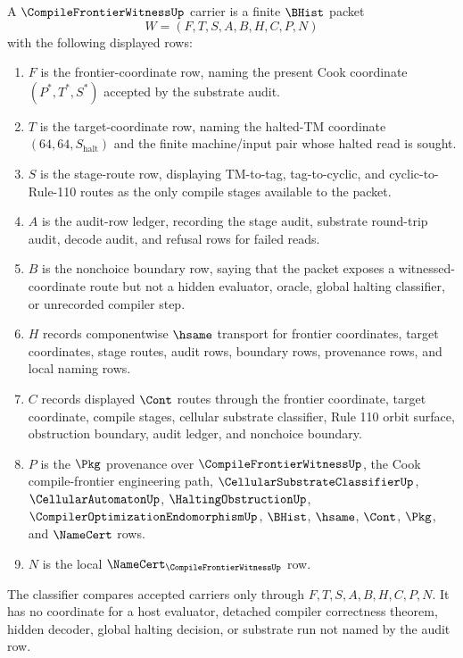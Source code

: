 \begin{definition}
\label{def:compile-frontier-witness-carrier}
A $\CompileFrontierWitnessUp$ carrier is a finite $\BHist$ packet
$$
W=(F,T,S,A,B,H,C,P,N)
$$
with the following displayed rows:
\begin{enumerate}
\item $F$ is the frontier-coordinate row, naming the present Cook coordinate $(P^*,T^*,S^*)$ accepted by the substrate audit.
\item $T$ is the target-coordinate row, naming the halted-TM coordinate $(64,64,S_{\mathrm{halt}})$ and the finite machine/input pair whose halted read is sought.
\item $S$ is the stage-route row, displaying TM-to-tag, tag-to-cyclic, and cyclic-to-Rule-110 routes as the only compile stages available to the packet.
\item $A$ is the audit-row ledger, recording the stage audit, substrate round-trip audit, decode audit, and refusal rows for failed reads.
\item $B$ is the nonchoice boundary row, saying that the packet exposes a witnessed-coordinate route but not a hidden evaluator, oracle, global halting classifier, or unrecorded compiler step.
\item $H$ records componentwise $\hsame$ transport for frontier coordinates, target coordinates, stage routes, audit rows, boundary rows, provenance rows, and local naming rows.
\item $C$ records displayed $\Cont$ routes through the frontier coordinate, target coordinate, compile stages, cellular substrate classifier, Rule 110 orbit surface, obstruction boundary, audit ledger, and nonchoice boundary.
\item $P$ is the $\Pkg$ provenance over $\CompileFrontierWitnessUp$, the Cook compile-frontier engineering path, $\CellularSubstrateClassifierUp$, $\CellularAutomatonUp$, $\HaltingObstructionUp$, $\CompilerOptimizationEndomorphismUp$, $\BHist$, $\hsame$, $\Cont$, $\Pkg$, and $\NameCert$ rows.
\item $N$ is the local $\NameCert_{\CompileFrontierWitnessUp}$ row.
\end{enumerate}
The classifier compares accepted carriers only through $F,T,S,A,B,H,C,P,N$. It has no coordinate for a host evaluator, detached compiler correctness theorem, hidden decoder, global halting decision, or substrate run not named by the audit row.
\end{definition}

